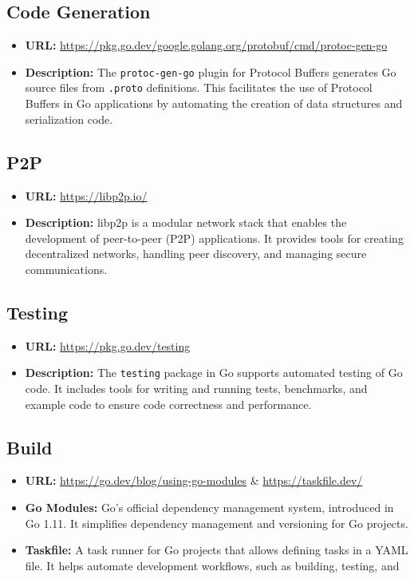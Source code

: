 \subsection{Code Generation}
\begin{itemize}
    \item \textbf{URL:} \url{https://pkg.go.dev/google.golang.org/protobuf/cmd/protoc-gen-go}
    \item \textbf{Description:} The \texttt{protoc-gen-go} plugin for Protocol Buffers generates Go source files from \texttt{.proto} definitions. This facilitates the use of Protocol Buffers in Go applications by automating the creation of data structures and serialization code.
\end{itemize}

\subsection{P2P}
\begin{itemize}
    \item \textbf{URL:} \url{https://libp2p.io/}
    \item \textbf{Description:} libp2p is a modular network stack that enables the development of peer-to-peer (P2P) applications. It provides tools for creating decentralized networks, handling peer discovery, and managing secure communications.
\end{itemize}

\subsection{Testing}
\begin{itemize}
    \item \textbf{URL:} \url{https://pkg.go.dev/testing}
    \item \textbf{Description:} The \texttt{testing} package in Go supports automated testing of Go code. It includes tools for writing and running tests, benchmarks, and example code to ensure code correctness and performance.
\end{itemize}

\subsection{Build}
\begin{itemize}
    \item \textbf{URL:} \url{https://go.dev/blog/using-go-modules} \& \url{https://taskfile.dev/}
    \item \textbf{Go Modules:} Go's official dependency management system, introduced in Go 1.11. It simplifies dependency management and versioning for Go projects.
    \item \textbf{Taskfile:} A task runner for Go projects that allows defining tasks in a YAML file. It helps automate development workflows, such as building, testing, and
\end{itemize}

